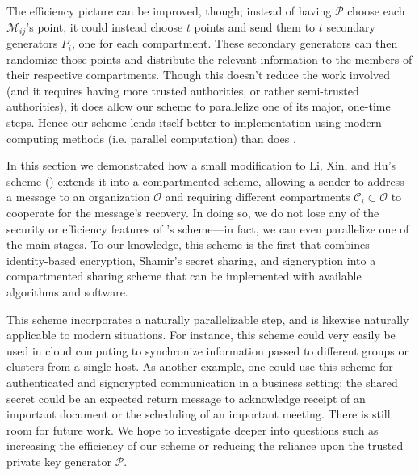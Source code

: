 The efficiency picture can be improved, though; instead of having $\mathcal{P}$
    choose each $\mathcal{M}_{ij}$'s point, it could instead choose $t$ points
    and send them to $t$ secondary generators $P_i$, one for each compartment.
These secondary generators can then randomize those points and distribute the
    relevant information to the members of their respective compartments.
Though this doesn't reduce the work involved (and it requires having more
    trusted authorities, or rather semi-trusted authorities), it does allow
    our scheme to parallelize one of its major, one-time steps.
Hence our scheme lends itself better to implementation using modern computing
    methods (i.e. parallel computation) than does \cite{li2006id}.


In this section we demonstrated how a small modification to Li, Xin, and Hu's
    scheme (\cite{li2006id}) extends it into a compartmented scheme, allowing a
    sender to address a message to an organization $\mathcal{O}$ and requiring
    different compartments $\mathcal{C}_i \subset \mathcal{O}$ to cooperate for
    the message's recovery.
In doing so, we do not lose any of the security or efficiency features of
    \cite{li2006id}'s scheme---in fact, we can even parallelize one of the main
    stages.
To our knowledge, this scheme is the first that combines identity-based
    encryption, Shamir's secret sharing, and signcryption into a compartmented
    sharing scheme that can be implemented with available algorithms and
    software.

This scheme incorporates a naturally parallelizable step, and is likewise
    naturally applicable to modern situations.
For instance, this scheme could very easily be used in cloud computing to
    synchronize information passed to different groups or clusters from a
    single host.
As another example, one could use this scheme for authenticated and signcrypted
    communication in a business setting; the shared secret could be an expected
    return message to acknowledge receipt of an important document or the
    scheduling of an important meeting.
There is still room for future work.
We hope to investigate deeper into questions such as increasing the efficiency
    of our scheme or reducing the reliance upon the trusted private key
    generator $\mathcal{P}$.
